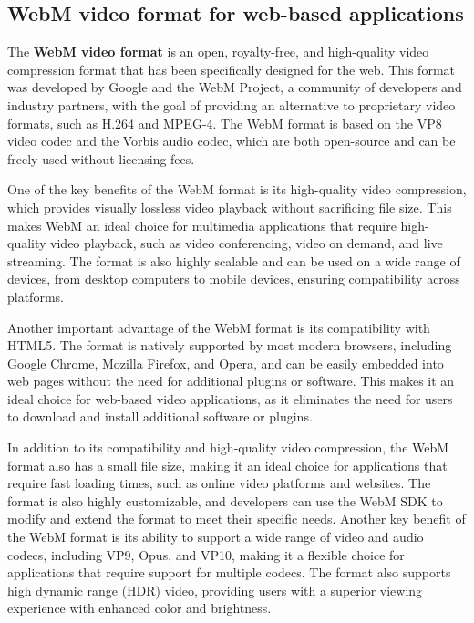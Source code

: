 \subsection{WebM video format for web-based applications}
The \textbf{WebM video format} is an open, royalty-free, and high-quality video compression format 
that has been specifically designed for the web. This format was developed by Google and 
the WebM Project, a community of developers and industry partners, with the goal of 
providing an alternative to proprietary video formats, such as H.264 and MPEG-4. 
The WebM format is based on the VP8 video codec and the Vorbis audio codec, 
which are both open-source and can be freely used without licensing fees.

One of the key benefits of the WebM format is its high-quality video compression, 
which provides visually lossless video playback without sacrificing file size. 
This makes WebM an ideal choice for multimedia applications that require 
high-quality video playback, such as video conferencing, video on demand, and live streaming. The format 
is also highly scalable and can be used on a wide range of devices, from desktop computers to mobile 
devices, ensuring compatibility across platforms.

Another important advantage of the WebM format is its compatibility with HTML5. The format is 
natively supported by most modern browsers, including Google Chrome, Mozilla Firefox, and Opera, 
and can be easily embedded into web pages without the need for additional plugins or software. 
This makes it an ideal choice for web-based video applications, as it eliminates the need for 
users to download and install additional software or plugins.

In addition to its compatibility and high-quality video compression, the WebM format also has 
a small file size, making it an ideal choice for applications that require fast loading times, 
such as online video platforms and websites. The format is also highly customizable, and developers 
can use the WebM SDK to modify and extend the format to meet their specific needs.
Another key benefit of the WebM format is its ability to support a wide range of video and audio 
codecs, including VP9, Opus, and VP10, making it a flexible choice for applications that require 
support for multiple codecs. The format also supports high dynamic range (HDR) video, providing 
users with a superior viewing experience with enhanced color and brightness. \cite{webm}
\\
\\
